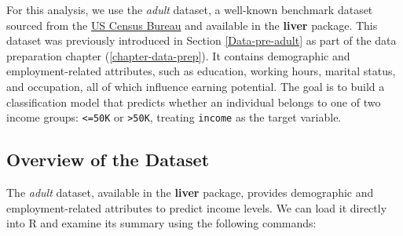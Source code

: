 \documentclass[
  11pt,
]{book}
\newcommand{\passthrough}[1]{#1}
\theoremstyle{definition}
\theoremstyle{definition}
\theoremstyle{definition}
\theoremstyle{definition}
\theoremstyle{remark}
\begin{document}
For this analysis, we use the \emph{adult} dataset, a well-known benchmark dataset sourced from the \href{https://www.census.gov}{US Census Bureau} and available in the \textbf{liver} package. This dataset was previously introduced in Section \ref{Data-pre-adult} as part of the data preparation chapter (\ref{chapter-data-prep}). It contains demographic and employment-related attributes, such as education, working hours, marital status, and occupation, all of which influence earning potential. The goal is to build a classification model that predicts whether an individual belongs to one of two income groups: \passthrough{\lstinline!<=50K!} or \passthrough{\lstinline!>50K!}, treating \passthrough{\lstinline!income!} as the target variable.

\subsection*{Overview of the Dataset}\label{overview-of-the-dataset-1}


The \emph{adult} dataset, available in the \textbf{liver} package, provides demographic and employment-related attributes to predict income levels. We can load it directly into R and examine its summary using the following commands:
\end{document}
